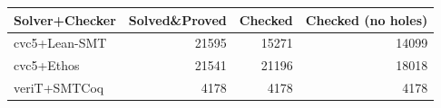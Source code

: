 \begin{tabular}{lrrr}
    \toprule
    Solver+Checker & Solved\&Proved & Checked & Checked (no holes) \\
    \midrule
    cvc5+Lean-SMT  & 21595          & 15271   & 14099              \\
    cvc5+Ethos     & 21541          & 21196   & 18018              \\
    veriT+SMTCoq   & 4178           & 4178    & 4178               \\
    \bottomrule
\end{tabular}
